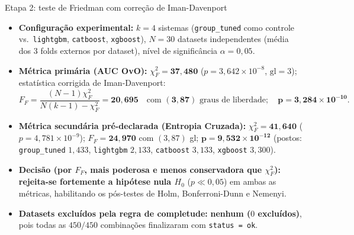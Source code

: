 \documentclass[aspectratio=169,11pt]{beamer}
\begin{document}
\begin{frame}{Etapa 2: teste de Friedman com correção de Iman-Davenport}
    \begin{itemize}
        \item \textbf{Configuração experimental:} $k = 4$ sistemas (\texttt{group\_tuned} como controle vs.\ \texttt{lightgbm}, \texttt{catboost}, \texttt{xgboost}), $N = 30$ datasets independentes (média dos 3 folds externos por dataset), nível de significância $\alpha = 0{,}05$.
        \item \textbf{Métrica primária (AUC OvO):} $\chi^2_F = \mathbf{37{,}480}$ ($p = 3{,}642 \times 10^{-8}$, $\text{gl}=3$); estatística corrigida de Iman-Davenport:
        \[
            F_F = \frac{(N - 1)\chi^2_F}{N(k - 1) - \chi^2_F} = \mathbf{20{,}695} \quad \text{com } \mathbf{(3, 87)} \text{ graus de liberdade}; \quad \mathbf{p = 3{,}284 \times 10^{-10}}.
        \]
        \item \textbf{Métrica secundária pré-declarada (Entropia Cruzada):} $\chi^2_F = \mathbf{41{,}640}$ ($p = 4{,}781 \times 10^{-9}$); $F_F = \mathbf{24{,}970}$ com $(3, 87)$ gl; $\mathbf{p = 9{,}532 \times 10^{-12}}$ (postos: \texttt{group\_tuned} $1{,}433$, \texttt{lightgbm} $2{,}133$, \texttt{catboost} $3{,}133$, \texttt{xgboost} $3{,}300$).
        \item \textbf{Decisão (por $F_F$, mais poderosa e menos conservadora que $\chi^2_F$):} \textbf{rejeita-se fortemente a hipótese nula $H_0$} ($p \ll 0{,}05$) em ambas as métricas, habilitando os pós-testes de Holm, Bonferroni-Dunn e Nemenyi.
        \item \textbf{Datasets excluídos pela regra de completude:} \textbf{nenhum ($0$ excluídos)}, pois todas as $450/450$ combinações finalizaram com \texttt{status = ok}.
    \end{itemize}
\end{frame}
\end{document}
